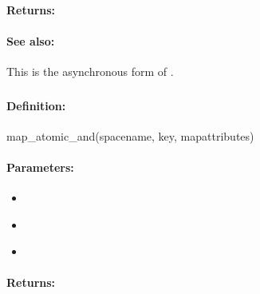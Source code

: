 \paragraph{Returns:}


\paragraph{See also:}  This is the asynchronous form of .

\pagebreak
\subsubsection{}
\label{api:ruby:map_atomic_and}


\paragraph{Definition:}
\begin{rubycode}
map_atomic_and(spacename, key, mapattributes)
\end{rubycode}

\paragraph{Parameters:}
\begin{itemize}[noitemsep]
\item {}\\

\item {}\\

\item {}\\

\end{itemize}

\paragraph{Returns:}


\pagebreak
\subsubsection{}
\label{api:ruby:async_map_atomic_and}


